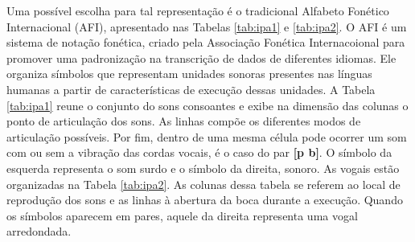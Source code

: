 Uma possível escolha para tal representação é o tradicional Alfabeto Fonético Internacional (AFI), apresentado nas Tabelas \ref{tab:ipa1} e \ref{tab:ipa2}. O AFI é um sistema de notação fonética, criado pela Associação Fonética Internacoional para promover uma padronização na transcrição de dados de diferentes idiomas. Ele organiza símbolos que representam unidades sonoras presentes nas línguas humanas a partir de características de execução dessas unidades. A Tabela \ref{tab:ipa1} reune o conjunto do sons consoantes e exibe na dimensão das colunas o ponto de articulação dos sons. As linhas compõe os diferentes modos de articulação possíveis. Por fim, dentro de uma mesma célula pode ocorrer um som com ou sem a vibração das cordas vocais, é o caso do par \textbf{[p b]}. O símbolo da esquerda representa o som surdo e o símbolo da direita, sonoro. As vogais estão organizadas na Tabela \ref{tab:ipa2}. As colunas dessa tabela se referem ao local de reprodução dos sons e as linhas à abertura da boca durante a execução. Quando os símbolos aparecem em pares, aquele da direita representa uma vogal arredondada. %
